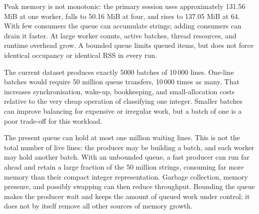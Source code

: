 Peak memory is not monotonic: the primary session uses approximately 131.56 MiB at one worker, falls to 50.16 MiB at four, and rises to 137.05 MiB at 64. With few consumers the queue can accumulate strings; adding consumers can drain it faster. At large worker counts, active batches, thread resources, and runtime overhead grow. A bounded queue limits queued items, but does not force identical occupancy or identical RSS in every run.

The current dataset produces exactly 5000 batches of 10\,000 lines. One-line batches would require 50 million queue transfers, 10\,000 times as many. That increases synchronisation, wake-up, bookkeeping, and small-allocation costs relative to the very cheap operation of classifying one integer. Smaller batches can improve balancing for expensive or irregular work, but a batch of one is a poor trade-off for this workload.

The present queue can hold at most one million waiting lines. This is not the total number of live lines: the producer may be building a batch, and each worker may hold another batch. With an unbounded queue, a fast producer can run far ahead and retain a large fraction of the 50 million strings, consuming far more memory than their compact integer representation. Garbage collection, memory pressure, and possibly swapping can then reduce throughput. Bounding the queue makes the producer wait and keeps the amount of queued work under control; it does not by itself remove all other sources of memory growth.
